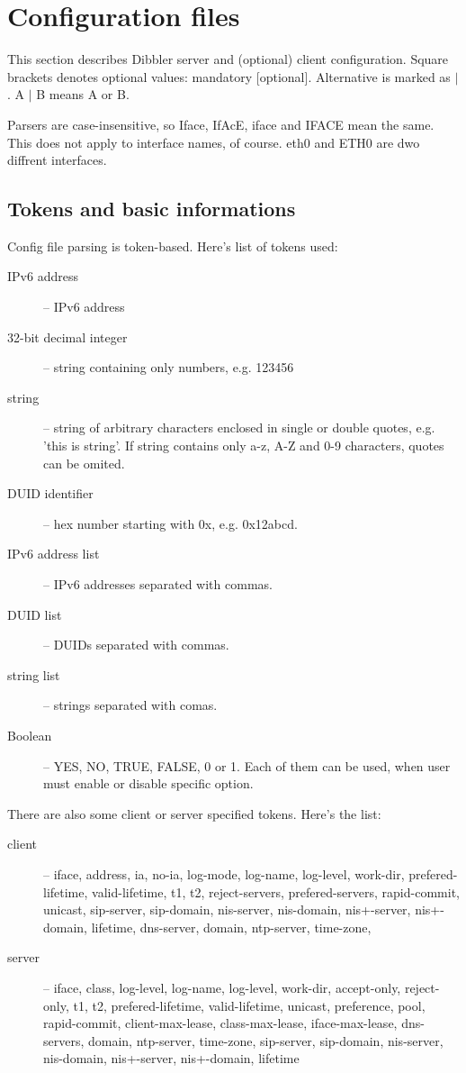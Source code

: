 
\section{Configuration files}

This section describes Dibbler server and (optional) client
configuration. Square brackets denotes optional values: mandatory
[optional]. Alternative is marked as $\mid$. A $\mid$ B means A or B.

Parsers are case-insensitive, so Iface, IfAcE, iface and IFACE mean the
same. This does not apply to interface names, of course. eth0 and ETH0
are dwo diffrent interfaces.

\subsection{Tokens and basic informations}
Config file parsing is token-based. Here's list of tokens used:
\begin{description}
\item[IPv6 address] -- IPv6 address 
\item[32-bit decimal integer] -- string containing only numbers, e.g. 123456
\item[string] -- string of arbitrary characters enclosed in single or double
  quotes, e.g. 'this is string'. If string contains only a-z, A-Z and
  0-9 characters, quotes can be omited.
\item[DUID identifier] -- hex number starting with 0x, e.g. 0x12abcd.
\item[IPv6 address list] -- IPv6 addresses separated with commas.
\item[DUID list] -- DUIDs separated with commas.
\item[string list] -- strings separated with comas.
\item[Boolean] -- YES, NO, TRUE, FALSE, 0 or 1. Each of them can be
  used, when user must enable or disable specific option.
\end{description}

There are also some client or server specified tokens. Here's the list:
\begin{description}
\item[client] -- iface, address, ia, no-ia, log-mode, log-name,
  log-level, work-dir, prefered-lifetime, valid-lifetime, t1, t2,
  reject-servers, prefered-servers, rapid-commit, unicast, sip-server,
  sip-domain, nis-server, nis-domain, nis+-server, nis+-domain,
  lifetime, dns-server, domain, ntp-server, time-zone,

\item[server] -- iface, class, log-level, log-name, log-level,
  work-dir, accept-only, reject-only, t1, t2, prefered-lifetime,
  valid-lifetime, unicast, preference, pool, rapid-commit,
  client-max-lease, class-max-lease, iface-max-lease, dns-servers,
  domain, ntp-server, time-zone, sip-server, sip-domain, nis-server,
  nis-domain, nis+-server, nis+-domain, lifetime
\end{description}

